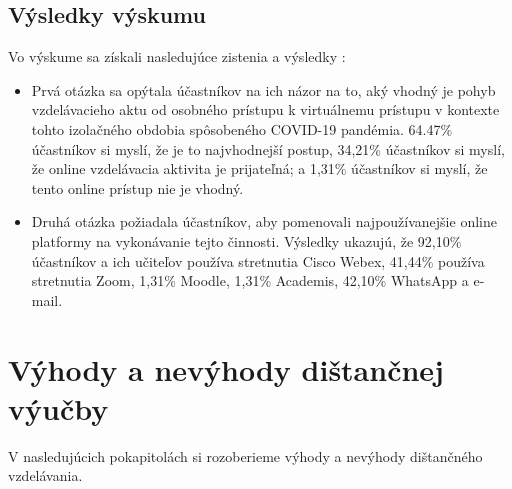 \documentclass[10pt,oneside,slovak,a4paper]{article}
\begin{document}
\subsection{Výsledky výskumu}%
Vo výskume sa získali nasledujúce zistenia a výsledky\cite{covid19} :
\begin{itemize}
	\item Prvá otázka sa opýtala účastníkov na ich názor na to, aký vhodný je pohyb vzdelávacieho aktu od osobného prístupu k virtuálnemu prístupu v kontexte tohto izolačného obdobia spôsobeného COVID-19 pandémia.
	 64.47\% účastníkov si myslí, že je to najvhodnejší postup, 34,21\% účastníkov si myslí, že online vzdelávacia aktivita je prijateľná; a 1,31\% účastníkov si myslí, že tento online prístup nie je vhodný.
	\item Druhá otázka požiadala účastníkov, aby pomenovali najpoužívanejšie online platformy na vykonávanie tejto činnosti. Výsledky ukazujú, že 92,10\% účastníkov a ich učiteľov používa stretnutia Cisco Webex, 41,44\% používa stretnutia Zoom, 1,31\% Moodle, 1,31\% Academis, 42,10\% WhatsApp a e-mail.
\end{itemize}



\section{Výhody a nevýhody dištančnej výučby}
V nasledujúcich pokapitolách si rozoberieme výhody a nevýhody dištančného vzdelávania\cite{Sokolova2018}. 
\end{document}
